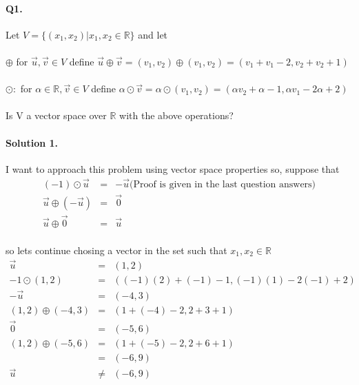 \documentclass[11pt]{article}
\newcommand{\R}{\mathbb{R}}
\begin{document}
\pagestyle{myheadings}

\paragraph{Q1.} Let
$
V= \{ (x_1,x_2) | x_1,x_2 \in  \R \}
$
and let
\paragraph{} $\oplus$ for $\vec{u},\vec{v} \in V$ define 
$
\vec{u} \oplus \vec{v}=(v_1,v_2) \oplus (v_1,v_2)=(v_1+v_1-2,v_2+v_2+1)
$
\paragraph{}$\odot:$ for $\alpha \in \R, \vec{v} \in V$ define
$
\alpha \odot \vec{v}=\alpha \odot (v_1,v_2)=(\alpha v_2 + \alpha -1,\alpha v_1 -2\alpha+2)
$
\\
\\
Is V a vector space over $\R$ with the above operations?

\paragraph{Solution 1.}I want to approach this problem using vector space properties so, suppose that
\begin{eqnarray*}
(-1) \odot \vec{u}&=&-\vec{u} \text{(Proof is given in the last question answers)}
\\ \vec{u} \oplus (-\vec{u})&=&\vec{0}
\\ \vec{u} \oplus \vec{0} &=& \vec{u}
\end{eqnarray*}
\paragraph{}so lets continue chosing a vector in the set such that $x_1,x_2 \in \R$
\begin{eqnarray*}
\vec{u}&=&(1,2)
\\ -1 \odot (1,2) &=& ((-1)(2)+(-1)-1,(-1)(1)-2(-1)+2)
\\ -\vec{u} &=& (-4,3)
\\ (1,2) \oplus (-4,3) &=& (1+(-4)-2,2+3+1)
\\ \vec{0}&=&(-5,6)
\\ (1,2) \oplus (-5,6)&=&(1+(-5)-2,2+6+1)
\\ &=& (-6,9)
\\ \vec{u} &\neq& (-6,9)
\end{eqnarray*}
\end{document}

